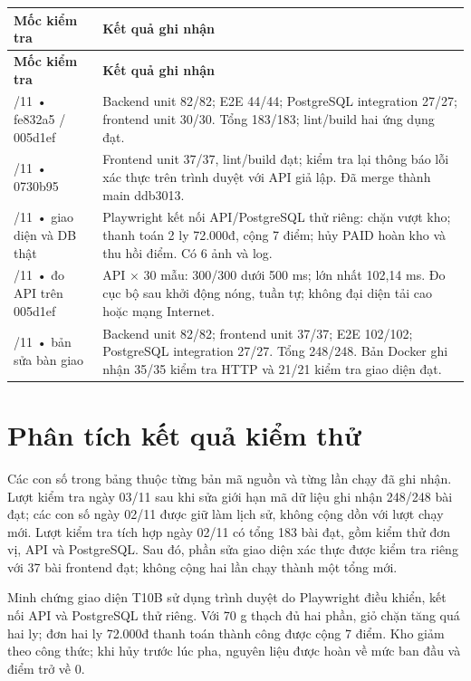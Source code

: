 \documentclass[12pt,a4paper]{report}
\begin{document}
\begingroup
\small
\setlength{\tabcolsep}{5pt}
\renewcommand{\arraystretch}{1.2}
\begin{longtable}{|>{\raggedright\arraybackslash}p{}|>{\raggedright\arraybackslash}p{}|}
\hline
\textbf{Mốc kiểm tra} & \textbf{Kết quả ghi nhận} \\ \hline
\endfirsthead
\hline
\textbf{Mốc kiểm tra} & \textbf{Kết quả ghi nhận} \\ \hline
\endhead
\endfoot
\endlastfoot
02/11 • fe832a5 / 005d1ef & Backend unit 82/82; E2E 44/44; PostgreSQL integration 27/27; frontend unit 30/30. Tổng 183/183; lint/build hai ứng dụng đạt. \\ \hline
02/11 • 0730b95 & Frontend unit 37/37, lint/build đạt; kiểm tra lại thông báo lỗi xác thực trên trình duyệt với API giả lập. Đã merge thành main ddb3013. \\ \hline
02/11 • giao diện và DB thật & Playwright kết nối API/PostgreSQL thử riêng: chặn vượt kho; thanh toán 2 ly 72.000đ, cộng 7 điểm; hủy PAID hoàn kho và thu hồi điểm. Có 6 ảnh và log. \\ \hline
02/11 • đo API trên 005d1ef & 10 API \ensuremath{\times} 30 mẫu: 300/300 dưới 500 ms; lớn nhất 102,14 ms. Đo cục bộ sau khởi động nóng, tuần tự; không đại diện tải cao hoặc mạng Internet. \\ \hline
03/11 • bản sửa bàn giao & Backend unit 82/82; frontend unit 37/37; E2E 102/102; PostgreSQL integration 27/27. Tổng 248/248. Bản Docker ghi nhận 35/35 kiểm tra HTTP và 21/21 kiểm tra giao diện đạt. \\ \hline
\end{longtable}
\endgroup


\section{Phân tích kết quả kiểm thử}

Các con số trong bảng thuộc từng bản mã nguồn và từng lần chạy đã ghi nhận. Lượt kiểm tra ngày 03/11 sau khi sửa giới hạn mã dữ liệu ghi nhận 248/248 bài đạt; các con số ngày 02/11 được giữ làm lịch sử, không cộng dồn với lượt chạy mới. Lượt kiểm tra tích hợp ngày 02/11 có tổng 183 bài đạt, gồm kiểm thử đơn vị, API và PostgreSQL. Sau đó, phần sửa giao diện xác thực được kiểm tra riêng với 37 bài frontend đạt; không cộng hai lần chạy thành một tổng mới.


Minh chứng giao diện T10B sử dụng trình duyệt do Playwright điều khiển, kết nối API và PostgreSQL thử riêng. Với 70 g thạch đủ hai phần, giỏ chặn tăng quá hai ly; đơn hai ly 72.000đ thanh toán thành công được cộng 7 điểm. Kho giảm theo công thức; khi hủy trước lúc pha, nguyên liệu được hoàn về mức ban đầu và điểm trở về 0.
\end{document}
